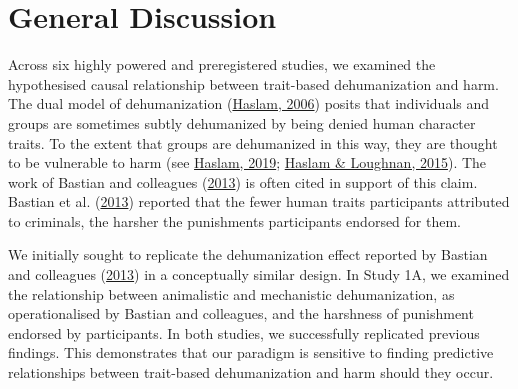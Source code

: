 \documentclass[
]{article}
\begin{document}
\hypertarget{general-discussion}{%
\section{General Discussion}\label{general-discussion}}

Across six highly powered and preregistered studies, we examined the hypothesised causal relationship between trait-based dehumanization and harm. The dual model of dehumanization (\protect\hyperlink{ref-Haslam2006}{Haslam, 2006}) posits that individuals and groups are sometimes subtly dehumanized by being denied human character traits. To the extent that groups are dehumanized in this way, they are thought to be vulnerable to harm (see \protect\hyperlink{ref-Haslam2019}{Haslam, 2019}; \protect\hyperlink{ref-Haslam2015}{Haslam \& Loughnan, 2015}). The work of Bastian and colleagues (\protect\hyperlink{ref-Bastian2013}{2013}) is often cited in support of this claim. Bastian et al. (\protect\hyperlink{ref-Bastian2013}{2013}) reported that the fewer human traits participants attributed to criminals, the harsher the punishments participants endorsed for them.

We initially sought to replicate the dehumanization effect reported by Bastian and colleagues (\protect\hyperlink{ref-Bastian2013}{2013}) in a conceptually similar design. In Study 1A, we examined the relationship between animalistic and mechanistic dehumanization, as operationalised by Bastian and colleagues, and the harshness of punishment endorsed by participants. In both studies, we successfully replicated previous findings. This demonstrates that our paradigm is sensitive to finding predictive relationships between trait-based dehumanization and harm should they occur.
\end{document}
